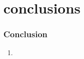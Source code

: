 \section{conclusions}
\begin{frame}
\frametitle{Conclusion}

\begin{enumerate}
	\item 

\end{enumerate}


\end{frame}